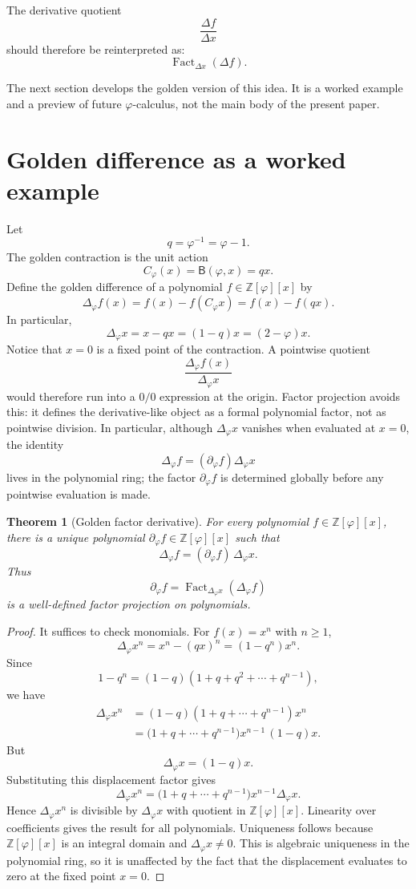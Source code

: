 \documentclass[11pt]{article}
\newtheorem{theorem}[definition]{Theorem}
\newcommand{\B}{\mathsf{B}}
\newcommand{\Fact}{\operatorname{Fact}}
\newcommand{\ph}{\varphi}
\newcommand{\Z}{\mathbb{Z}}
\begin{document}
The derivative quotient
\[
    \frac{\Delta f}{\Delta x}
\]
should therefore be reinterpreted as:
\[
    \Fact_{\Delta x}(\Delta f).
\]

The next section develops the golden version of this idea.  It is a worked example and a preview of future $\ph$-calculus, not the main body of the present paper.

\section{Golden difference as a worked example}

Let
\[
    q=\ph^{-1}=\ph-1.
\]
The golden contraction is the unit action
\[
    C_\ph(x)=\B(\ph,x)=qx.
\]
Define the golden difference of a polynomial $f\in\Z[\ph][x]$ by
\[
    \Delta_\ph f(x)=f(x)-f(C_\ph x)=f(x)-f(qx).
\]
In particular,
\[
    \Delta_\ph x=x-qx=(1-q)x=(2-\ph)x.
\]
Notice that $x=0$ is a fixed point of the contraction.  A pointwise quotient
\[
    \frac{\Delta_\ph f(x)}{\Delta_\ph x}
\]
would therefore run into a $0/0$ expression at the origin.  Factor projection avoids this: it defines the derivative-like object as a formal polynomial factor, not as pointwise division.  In particular, although $\Delta_\ph x$ vanishes when evaluated at $x=0$, the identity
\[
    \Delta_\ph f=(\partial_\ph f)\Delta_\ph x
\]
lives in the polynomial ring; the factor $\partial_\ph f$ is determined globally before any pointwise evaluation is made.

\begin{theorem}[Golden factor derivative]
For every polynomial $f\in\Z[\ph][x]$, there is a unique polynomial $\partial_\ph f\in\Z[\ph][x]$ such that
\[
    \Delta_\ph f=(\partial_\ph f)\,\Delta_\ph x.
\]
Thus
\[
    \partial_\ph f=\Fact_{\Delta_\ph x}(\Delta_\ph f)
\]
is a well-defined factor projection on polynomials.
\end{theorem}

\begin{proof}
It suffices to check monomials.  For $f(x)=x^n$ with $n\ge1$,
\[
    \Delta_\ph x^n=x^n-(qx)^n=(1-q^n)x^n.
\]
Since
\[
    1-q^n=(1-q)(1+q+q^2+\cdots+q^{n-1}),
\]
we have
\[
\begin{aligned}
    \Delta_\ph x^n
    &= (1-q)(1+q+\cdots+q^{n-1})x^n \\
    &= \bigl(1+q+\cdots+q^{n-1}\bigr)x^{n-1}\,(1-q)x.
\end{aligned}
\]
But
\[
    \Delta_\ph x=(1-q)x.
\]
Substituting this displacement factor gives
\[
    \Delta_\ph x^n
    =\bigl(1+q+\cdots+q^{n-1}\bigr)x^{n-1}\Delta_\ph x.
\]
Hence $\Delta_\ph x^n$ is divisible by $\Delta_\ph x$ with quotient in $\Z[\ph][x]$.  Linearity over coefficients gives the result for all polynomials.  Uniqueness follows because $\Z[\ph][x]$ is an integral domain and $\Delta_\ph x\ne0$.  This is algebraic uniqueness in the polynomial ring, so it is unaffected by the fact that the displacement evaluates to zero at the fixed point $x=0$.
\end{proof}
\end{document}
